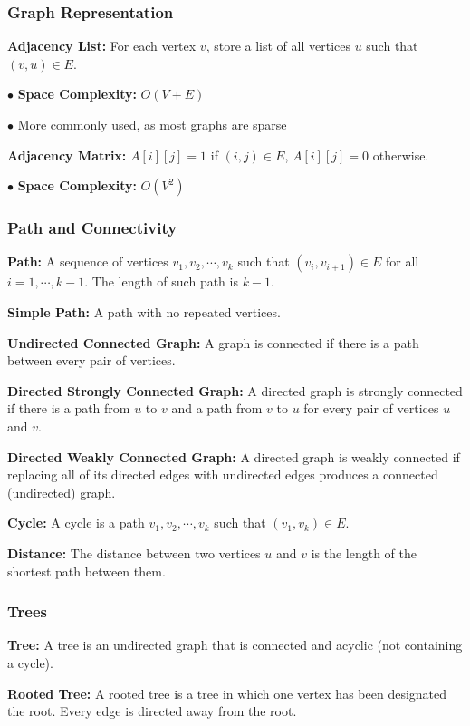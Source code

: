 \documentclass[10pt]{article}
\begin{document}
\subsubsection{Graph Representation}

\textbf{Adjacency List:} For each vertex $v$, store a list of all vertices $u$ such that $(v, u) \in E$.

$\bullet$ \textbf{Space Complexity:} $O(V+E)$

$\bullet$ More commonly used, as most graphs are sparse

\textbf{Adjacency Matrix:} $A[i][j] = 1$ if $(i, j) \in E$, $A[i][j] = 0$ otherwise.

$\bullet$ \textbf{Space Complexity:} $O(V^2)$

\subsubsection{Path and Connectivity}

\textbf{Path:} A sequence of vertices $v_1, v_2, \cdots, v_k$ such that $(v_i, v_{i+1}) \in E$ for all $i = 1, \cdots, k-1$. The length of such path is $k-1$.

\textbf{Simple Path:} A path with no repeated vertices.

\textbf{Undirected Connected Graph:} A graph is connected if there is a path between every pair of vertices.

\textbf{Directed Strongly Connected Graph:} A directed graph is strongly connected if there is a path from $u$ to $v$ and a path from $v$ to $u$ for every pair of vertices $u$ and $v$.

\textbf{Directed Weakly Connected Graph:} A directed graph is weakly connected if replacing all of its directed edges with undirected edges produces a connected (undirected) graph.

\textbf{Cycle:} A cycle is a path $v_1, v_2, \cdots, v_k$ such that $(v_1, v_k) \in E$.

\textbf{Distance:} The distance between two vertices $u$ and $v$ is the length of the shortest path between them.

\subsubsection{Trees}

\textbf{Tree:} A tree is an undirected graph that is connected and acyclic (not containing a cycle).

\textbf{Rooted Tree:} A rooted tree is a tree in which one vertex has been designated the root. Every edge is directed away from the root.
\end{document}

